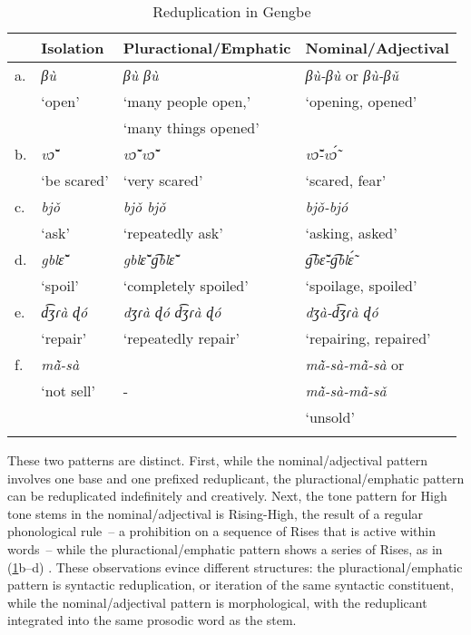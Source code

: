 \documentclass[output=paper,colorlinks,citecolor=brown]{langscibook}
\begin{document}
\begin{table}
\caption{Reduplication in Gengbe}
\label{tab:RedupGengbe}
 \begin{tabularx}{.8\textwidth}{llll}
  \lsptoprule
    &  Isolation & Pluractional/Emphatic & Nominal/Adjectival \\
  \midrule
a. & \textit{βù}  & \textit{βù βù}   & \textit{βù-βù} or \textit{βù-βǔ}  \\
& `open' & `many people open,'  & `opening, opened' \\
& & `many things opened' & \\

b. & \textit{vɔ̃̌} & \textit{vɔ̃̌ vɔ̃̌} & \textit{vɔ̃̌-vɔ̃́}  \\
& `be scared' & `very scared'  & `scared, fear' \\

c. & \textit{bjǒ} & \textit{bjǒ bjǒ} & \textit{bjǒ-bjó} \\
& `ask' & `repeatedly ask' & `asking, asked' \\

d. & \textit{gblɛ̃̌}  & \textit{gblɛ̃̌ g͡blɛ̃̌}  & \textit{g͡bɛ̃̌-g͡blɛ̃́} \\
& `spoil' & `completely spoiled' & `spoilage, spoiled' \\

e. & \textit{d͡ʒɾà ɖó} & \textit{dʒɾà ɖó d͡ʒɾà ɖó} & \textit{dʒà-d͡ʒɾà ɖó} \\
& `repair' & `repeatedly repair' & `repairing, repaired' \\

f. & \textit{mã̀-sà} &  & \textit{mã̀-sà-mã̀-sà} or \\
& `not sell' & - & \textit{mã̀-sà-mã̀-sǎ} \\
&  &  & `unsold' \\

  \lspbottomrule
 \end{tabularx}
\end{table}

These two patterns are distinct. First, while the nominal/adjectival pattern involves one base and one prefixed reduplicant, the pluractional/emphatic pattern can be reduplicated indefinitely and creatively. Next, the tone pattern for High tone stems in the nominal/adjectival is Rising-High, the result of a regular phonological rule~-- a prohibition on a sequence of Rises that is active within words~-- while the pluractional/emphatic pattern shows a series of Rises, as in (\ref{tab:RedupGengbe}b--d) \citep{LotvenandBerkson2019}. These observations evince different structures: the pluractional/emphatic pattern is syntactic reduplication, or iteration of the same syntactic constituent, while the nominal/adjectival pattern is morphological, with the reduplicant integrated into the same prosodic word as the stem.\largerpage[2]
\end{document}
